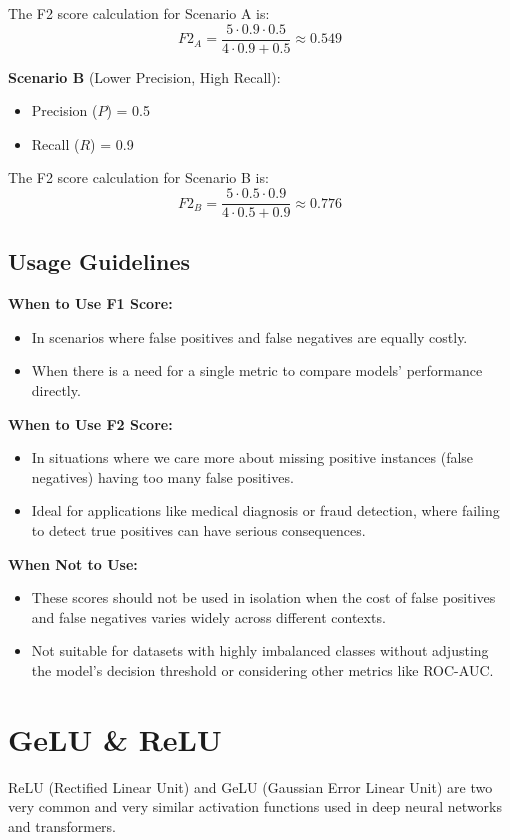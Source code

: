 \documentclass[12pt]{article}
\begin{document}
The F2 score calculation for Scenario A is:
\[ F2_A = \frac{5 \cdot 0.9 \cdot 0.5}{4 \cdot 0.9 + 0.5} \approx 0.549 \]

\textbf{Scenario B} (Lower Precision, High Recall):
\begin{itemize}
    \item Precision (\(P\)) = 0.5
    \item Recall (\(R\)) = 0.9
\end{itemize}
The F2 score calculation for Scenario B is:
\[ F2_B = \frac{5 \cdot 0.5 \cdot 0.9}{4 \cdot 0.5 + 0.9} \approx 0.776 \]
\subsection{Usage Guidelines}

\textbf{When to Use F1 Score:}
\begin{itemize}
    \item In scenarios where false positives and false negatives are equally costly.
    \item When there is a need for a single metric to compare models' performance directly.
\end{itemize}

\textbf{When to Use F2 Score:}
\begin{itemize}
    \item In situations where we care more about missing positive instances (false negatives) having too many false positives. 
    \item Ideal for applications like medical diagnosis or fraud detection, where failing to detect true positives can have serious consequences.
\end{itemize}

\textbf{When Not to Use:}
\begin{itemize}
    \item These scores should not be used in isolation when the cost of false positives and false negatives varies widely across different contexts.
    \item Not suitable for datasets with highly imbalanced classes without adjusting the model's decision threshold or considering other metrics like ROC-AUC.
\end{itemize}
\section{GeLU \& ReLU}
ReLU (Rectified Linear Unit) and GeLU (Gaussian Error Linear Unit) are two very common and very similar activation functions used in deep neural networks and transformers. \\
\end{document}
